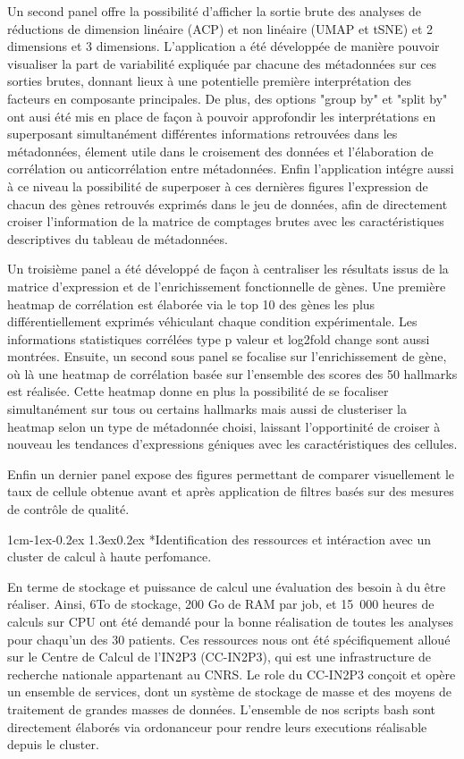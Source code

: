 \documentclass[12pt]{report}
\makeatletter
\renewcommand\subsubsection{\@startsection{subsubsection}{3}{\z@}%
	{1cm\@plus -1ex\@minus -0.2ex}%
	{1.3ex\@plus 0.2ex}%
	{\reset@font\normalsize\bf}}
\makeatother
\begin{document}
Un second panel offre la possibilité d'afficher la sortie brute des analyses de réductions de dimension linéaire (ACP) et non linéaire (UMAP et tSNE) et 2 dimensions et 3 dimensions.
L'application a été développée de manière pouvoir visualiser la part de variabilité expliquée par chacune des métadonnées sur ces sorties brutes, donnant lieux à une potentielle première interprétation des facteurs en composante principales.
De plus, des options "group by" et "split by" ont ausi été mis en place de façon à pouvoir approfondir les interprétations en superposant simultanément différentes informations retrouvées dans les métadonnées, 
élement utile dans le croisement des données et l'élaboration de corrélation ou anticorrélation entre métadonnées.
Enfin l'application intégre aussi à ce niveau la possibilité de superposer à ces dernières figures l'expression de chacun des gènes retrouvés exprimés dans le jeu de données, 
afin de directement croiser l'information de la matrice de comptages brutes avec les caractéristiques descriptives du tableau de métadonnées.

Un troisième panel a été développé de façon à centraliser les résultats issus de la matrice d'expression et de l'enrichissement fonctionnelle de gènes.
Une première heatmap de corrélation est élaborée via le top 10 des gènes les plus différentiellement exprimés véhiculant chaque condition expérimentale. Les informations statistiques corrélées type p valeur et log2fold change sont aussi montrées.
Ensuite, un second sous panel se focalise sur l'enrichissement de gène, où là une heatmap de corrélation basée sur l'ensemble des scores des 50 hallmarks est réalisée.
Cette heatmap donne en plus la possibilité de se focaliser simultanément sur tous ou certains hallmarks mais aussi de clusteriser la heatmap selon un type de métadonnée choisi, 
laissant l'opportinité de croiser à nouveau les tendances d'expressions géniques avec les caractéristiques des cellules.

Enfin un dernier panel expose des figures permettant de comparer visuellement le taux de cellule obtenue avant et après application de filtres basés sur des mesures de contrôle de qualité.

\subsubsection*{Identification des ressources et intéraction avec un cluster de calcul à haute perfomance.}

En terme de stockage et puissance de calcul une évaluation des besoin à du être réaliser. 
Ainsi, 6To de stockage, 200 Go de RAM par job, et 15 000 heures de calculs sur CPU ont été demandé pour la bonne réalisation de toutes les analyses pour chaqu'un des 30 patients.
Ces ressources nous ont été spécifiquement alloué sur le Centre de Calcul de l’IN2P3 (CC-IN2P3), qui est une infrastructure de recherche nationale appartenant au CNRS.
Le role du CC-IN2P3 conçoit et opère un ensemble de services, dont un système de stockage de masse et des moyens de traitement de grandes masses de données.
L'ensemble de nos scripts bash sont directement élaborés via ordonanceur pour rendre leurs executions réalisable depuis le cluster. 
\end{document}
